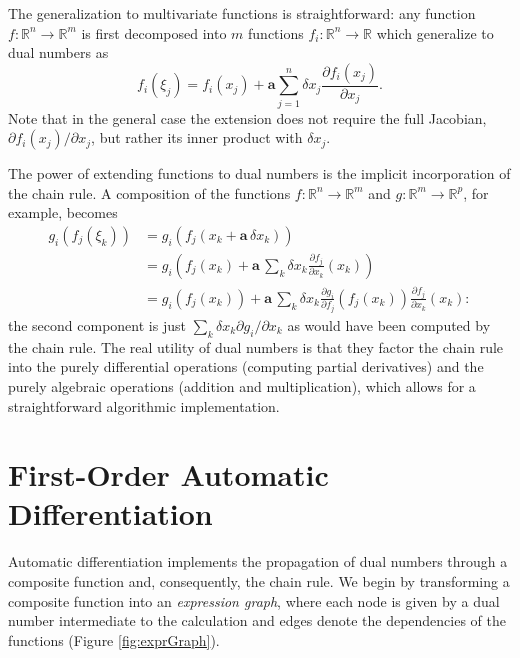 The generalization to multivariate functions is straightforward: any function 
$f : \mathbb{R}^{n} \rightarrow \mathbb{R}^{m}$ is first decomposed into $m$
functions $f_{i} : \mathbb{R}^{n} \rightarrow \mathbb{R}$ which generalize
to dual numbers as
%
\begin{equation} \label{dualFunction}
f_{i} \! \left( \xi_{j} \right) = f_{i} \! \left( x_{j} \right) 
+ \mathbf{a} \sum_{j = 1}^{n} \delta x_{j} \frac{ \partial f_{i} \! \left( x_{j} \right) }{ \partial x_{j} }.
\end{equation}
%
Note that in the general case the extension does not require the full Jacobian, 
$ \partial f_{i} \! \left( x_{j} \right) \! / \partial x_{j}$, but rather its inner product with 
$\delta x_{j}$.

The power of extending functions to dual numbers is the implicit incorporation of 
the chain rule. A composition of the functions $f : \mathbb{R}^{n} \rightarrow \mathbb{R}^{m}$ 
and $g : \mathbb{R}^{m} \rightarrow \mathbb{R}^{p}$, for example, becomes
%
\begin{align*}
g_{i} \! \left( f_{j} \! \left( \xi_{k} \right) \right)
&= 
g_{i} \! \left( f_{j} \! \left( x_{k} + \mathbf{a} \, \delta x_{k} \right) \right)
\\
&=
g_{i} \! \left( f_{j} \! \left( x_{k} \right) 
+ \mathbf{a} \, \sum_{k} \delta x_{k} \frac{ \partial f_{j} }{ \partial x_{k} } \! \left( x_{k} \right) \right)
\\
&=
g_{i} \! \left( f_{j} \! \left( x_{k} \right) \right)
+ \mathbf{a} \, \sum_{k} \delta x_{k} 
\frac{ \partial g_{i} }{ \partial f_{j} }  \! \left( f_{j} \! \left( x_{k} \right) \right)
\frac{ \partial f_{j} }{ \partial x_{k} } \! \left( x_{k} \right):
\end{align*}
%
the second component is just $\sum_{k} \delta x_{k} \partial g_{i} / \partial x_{k} $ 
as would have been computed by the chain rule.  The real utility of dual numbers is 
that they factor the chain rule into the purely differential operations (computing partial
derivatives) and the purely algebraic operations (addition and multiplication), which 
allows for a straightforward algorithmic implementation.

\section*{First-Order Automatic Differentiation}

Automatic differentiation implements the propagation of dual numbers through a
composite function and, consequently, the chain rule.  We begin by transforming
a composite function into an \textit{expression graph}, where each node is given
by a dual number intermediate to the calculation and edges denote the 
dependencies of the functions (Figure \ref{fig:exprGraph}).

